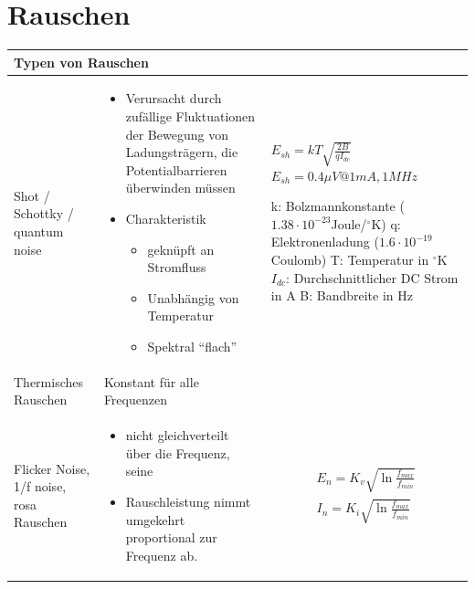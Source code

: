 \section{Rauschen}
\vspace{-3mm}
\begin{longtable}{|p{3.5cm}|p{6cm}|p{8cm}|}
	\hline
    \multicolumn{3}{|l|}{\bf Typen von Rauschen}
    \\ \hline
	Shot / Schottky / quantum noise
	& \vspace{-1.5\topsep}
      \begin{itemize}[leftmargin=*]
  		\item Verursacht durch zufällige Fluktuationen der Bewegung von Ladungsträgern, die Potentialbarrieren überwinden müssen
  		\item Charakteristik
  		\begin{itemize}
    		\item geknüpft an Stromfluss
    		\item Unabhängig von Temperatur
    		\item Spektral "`flach"'
    	\end{itemize}
	  \end{itemize}
	& {
		$E_{sh}=kT\sqrt{\frac{2B}{qI_{dc}}}$\newline
		$E_{sh}= 0.4\mu V @ 1mA,1MHz$\newline
        
		k: Bolzmannkonstante ($1.38 \cdot 10^{-23}$Joule/$^\circ$K)\newline
		q: Elektronenladung ($1.6 \cdot 10^{-19}$Coulomb)\newline
		T: Temperatur in $^\circ$K\newline
		$I_{dc}$: Durchschnittlicher DC Strom in A\newline
		B: Bandbreite in Hz
      }
	\\ \hdashline
	Thermisches Rauschen
	& Konstant für alle Frequenzen
	&
	\\ \hdashline
	Flicker Noise, 1/f noise, rosa Rauschen
	& \vspace{-1.5\topsep}
      \begin{itemize}[leftmargin=*]
	  	\item nicht gleichverteilt über die Frequenz, seine
  	  	\item Rauschleistung nimmt umgekehrt proportional zur Frequenz ab.
  	  \end{itemize}
  	& {\begin{gather*}
		E_{n}=K_{v}\sqrt{\ln{\frac{f_{max}}{f_{min}}}}\\
		I_{n}=K_{i}\sqrt{\ln{\frac{f_{max}}{f_{min}}}}
  	  \end{gather*}}\\
	\hline    
\end{longtable}
